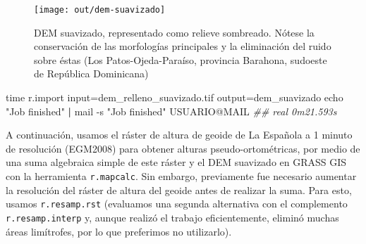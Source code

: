 \documentclass[spanish]{article}
\newenvironment{Shaded}{\begin{snugshade}}{\end{snugshade}}
\newcommand{\AttributeTok}[1]{\textcolor[rgb]{0.77,0.63,0.00}{#1}}
\newcommand{\BuiltInTok}[1]{#1}
\newcommand{\CommentTok}[1]{\textcolor[rgb]{0.56,0.35,0.01}{\textit{#1}}}
\newcommand{\ExtensionTok}[1]{#1}
\newcommand{\KeywordTok}[1]{\textcolor[rgb]{0.13,0.29,0.53}{\textbf{#1}}}
\newcommand{\NormalTok}[1]{#1}
\newcommand{\StringTok}[1]{\textcolor[rgb]{0.31,0.60,0.02}{#1}}
\begin{document}
\begin{figure}

{\centering \texttt{[image: out/dem-suavizado]} 

}

\caption{DEM suavizado, representado como relieve sombreado. Nótese la conservación de las morfologías principales y la eliminación del ruido sobre éstas (Los Patos-Ojeda-Paraíso, provincia Barahona, sudoeste de República Dominicana)}\label{fig:demsuavizado}
\end{figure}

\begin{Shaded}
\begin{Highlighting}[]
\BuiltInTok{time}\NormalTok{ r.import input=dem\_relleno\_suavizado.tif output=dem\_suavizado}
\BuiltInTok{echo} \StringTok{"Job finished"} \KeywordTok{|} \ExtensionTok{mail} \AttributeTok{{-}s} \StringTok{"Job finished"}\NormalTok{ USUARIO@MAIL}
\CommentTok{\#\# real 0m21.593s}
\end{Highlighting}
\end{Shaded}

A continuación, usamos el ráster de altura de geoide de La Española a 1
minuto de resolución (EGM2008) para obtener alturas pseudo-ortométricas,
por medio de una suma algebraica simple de este ráster y el DEM
suavizado en GRASS GIS con la herramienta \texttt{r.mapcalc}. Sin
embargo, previamente fue necesario aumentar la resolución del ráster de
altura del geoide antes de realizar la suma. Para esto, usamos
\texttt{r.resamp.rst} (evaluamos una segunda alternativa con el
complemento \texttt{r.resamp.interp} y, aunque realizó el trabajo
eficientemente, eliminó muchas áreas limítrofes, por lo que preferimos
no utilizarlo).
\end{document}
